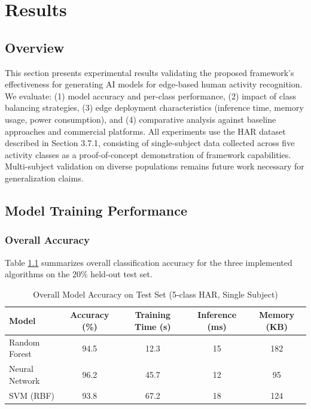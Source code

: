\chapter{Results}
\label{chap:results}

\section{Overview}
This section presents experimental results validating the proposed framework's effectiveness for generating AI models for edge-based human activity recognition. We evaluate: (1) model accuracy and per-class performance, (2) impact of class balancing strategies, (3) edge deployment characteristics (inference time, memory usage, power consumption), and (4) comparative analysis against baseline approaches and commercial platforms. All experiments use the HAR dataset described in Section 3.7.1, consisting of single-subject data collected across five activity classes as a proof-of-concept demonstration of framework capabilities. Multi-subject validation on diverse populations remains future work necessary for generalization claims.

\section{Model Training Performance}

\subsection{Overall Accuracy}
Table \ref{tab:model_accuracy} summarizes overall classification accuracy for the three implemented algorithms on the 20\% held-out test set.

\begin{table}[H]
    \centering
    \caption{Overall Model Accuracy on Test Set (5-class HAR, Single Subject)}
    \begin{tabular}{@{}lcccc@{}}
        \toprule
        Model & Accuracy (\%) & Training Time (s) & Inference (ms) & Memory (KB) \\ 
        \midrule
        Random Forest & 94.5 & 12.3 & 15 & 182 \\
        Neural Network & 96.2 & 45.7 & 12 & 95 \\
        SVM (RBF) & 93.8 & 67.2 & 18 & 124 \\ 
        \bottomrule
    \end{tabular}
    \label{tab:model_accuracy}
\end{table}


